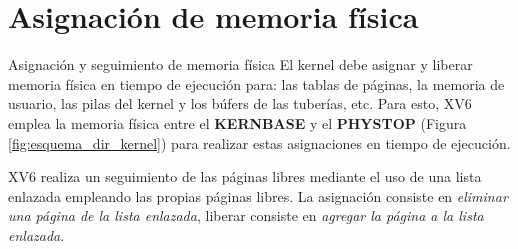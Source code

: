 \documentclass{libs/ufc_format}
\begin{document}
\section{Asignación de memoria física}
\begin{frame}{Asignación y seguimiento de memoria física}
    El kernel debe asignar y liberar memoria física en tiempo de ejecución para: las tablas de páginas, la memoria de usuario, las pilas del kernel y los búfers de las tuberías, etc. Para esto, XV6 emplea la memoria física entre el \textbf{KERNBASE} y el \textbf{PHYSTOP} (Figura \ref{fig:esquema_dir_kernel}) para realizar estas asignaciones en tiempo de ejecución. \cite{xv6_book}

    \vspace{0.3cm}

    XV6 realiza un seguimiento de las páginas libres mediante el uso de una lista enlazada empleando las propias páginas libres. La asignación consiste en \emph{eliminar una página de la lista enlazada}, liberar consiste en \emph{agregar la página a la lista enlazada}. \cite{xv6_book}
\end{frame}

\end{document}
